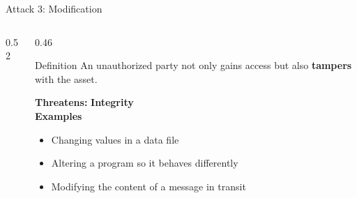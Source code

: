 \documentclass[aspectratio=169,11pt,xcolor={table}]{beamer}
\begin{document}
\begin{frame}{Attack 3: Modification}
  \begin{columns}[c]
    \begin{column}{0.52\textwidth}
      \centering
    \end{column}
    \begin{column}{0.46\textwidth}
      \begin{alertblock}{Definition}
        An unauthorized party not only gains access but also \textbf{tampers} with the asset.
      \end{alertblock}
      \vspace{1mm}
      \textbf{Threatens:} \textcolor{leaf!70!black}{\textbf{Integrity}}\\[3pt]
      \textbf{Examples}
      \begin{itemize}\small
        \item Changing values in a data file
        \item Altering a program so it behaves differently
        \item Modifying the content of a message in transit
      \end{itemize}
    \end{column}
  \end{columns}
\end{frame}
\end{document}
